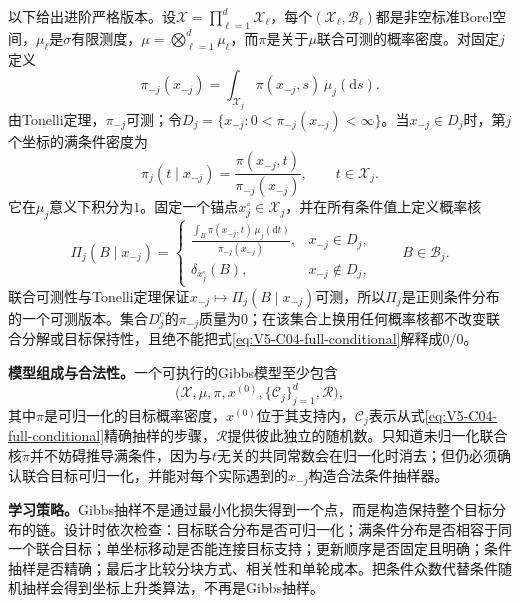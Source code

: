 \begin{definition}[满条件分布]\label{def:V5-C04-full-conditional}
以下给出进阶严格版本。设$\mathcal X=\prod_{\ell=1}^d\mathcal X_\ell$，每个$(\mathcal X_\ell,\mathcal B_\ell)$都是非空标准Borel空间，$\mu_\ell$是$\sigma$有限测度，$\mu=\bigotimes_{\ell=1}^d\mu_\ell$，而$\pi$是关于$\mu$联合可测的概率密度。对固定$j$定义
\begin{equation}\label{eq:V5-C04-marginal-minus-j}
\pi_{-j}(x_{-j})
=\int_{\mathcal X_j}\pi(x_{-j},s)\,\mu_j(\mathrm ds).
\end{equation}
由Tonelli定理，$\pi_{-j}$可测；令$D_j=\{x_{-j}:0<\pi_{-j}(x_{-j})<\infty\}$。当$x_{-j}\in D_j$时，第$j$个坐标的满条件密度为
\begin{equation}\label{eq:V5-C04-full-conditional}
\pi_j(t\mid x_{-j})
=\frac{\pi(x_{-j},t)}{\pi_{-j}(x_{-j})},
\qquad t\in\mathcal X_j.
\end{equation}
它在$\mu_j$意义下积分为$1$。固定一个锚点$x_j^\circ\in\mathcal X_j$，并在所有条件值上定义概率核
\begin{equation}\label{eq:V5-C04-full-conditional-kernel}
\Pi_j(B\mid x_{-j})=
\begin{cases}
\displaystyle\frac{\int_B\pi(x_{-j},t)\,\mu_j(\mathrm dt)}{\pi_{-j}(x_{-j})},&x_{-j}\in D_j,\\[1.0em]
\delta_{x_j^\circ}(B),&x_{-j}\notin D_j,
\end{cases}
\qquad B\in\mathcal B_j.
\end{equation}
联合可测性与Tonelli定理保证$x_{-j}\mapsto\Pi_j(B\mid x_{-j})$可测，所以$\Pi_j$是正则条件分布的一个可测版本。集合$D_j^c$的$\pi_{-j}$质量为$0$；在该集合上换用任何概率核都不改变联合分解或目标保持性，且绝不能把式\eqref{eq:V5-C04-full-conditional}解释成$0/0$。
\end{definition}

\label{struct:V5-C04-CH08}
\textbf{模型组成与合法性。}一个可执行的Gibbs模型至少包含
\[
\bigl(\mathcal X,\mu,\pi,x^{(0)},\{\mathcal C_j\}_{j=1}^d,\mathcal R\bigr),
\]
其中$\pi$是可归一化的目标概率密度，$x^{(0)}$位于其支持内，$\mathcal C_j$表示从式\eqref{eq:V5-C04-full-conditional}精确抽样的步骤，$\mathcal R$提供彼此独立的随机数。只知道未归一化联合核$\widetilde\pi$并不妨碍推导满条件，因为与$t$无关的共同常数会在归一化时消去；但仍必须确认联合目标可归一化，并能对每个实际遇到的$x_{-j}$构造合法条件抽样器。

\label{struct:V5-C04-CH09}
\textbf{学习策略。}Gibbs抽样不是通过最小化损失得到一个点，而是构造保持整个目标分布的链。设计时依次检查：目标联合分布是否可归一化；满条件分布是否相容于同一个联合目标；单坐标移动是否能连接目标支持；更新顺序是否固定且明确；条件抽样是否精确；最后才比较分块方式、相关性和单轮成本。把条件众数代替条件随机抽样会得到坐标上升类算法，不再是Gibbs抽样。

